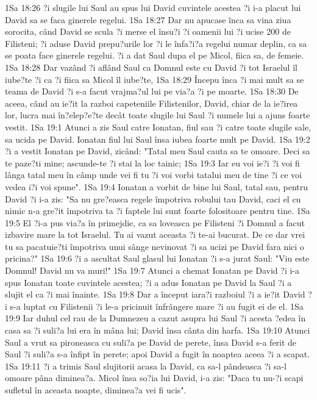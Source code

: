 1Sa 18:26  ?i slugile lui Saul au spus lui David cuvintele acestea ?i i-a placut lui David sa se faca ginerele regelui.
1Sa 18:27  Dar nu apucase înca sa vina ziua sorocita, când David se scula ?i merse el însu?i ?i oamenii lui ?i ucise 200 de Filisteni; ?i aduse David prepu?urile lor ?i le înfa?i?a regelui numar deplin, ca sa se poata face ginerele regelui. ?i a dat Saul dupa el pe Micol, fiica sa, de femeie.
1Sa 18:28  Dar vazând ?i aflând Saul ca Domnul este cu David ?i tot Israelul îl iube?te ?i ca ?i fiica sa Micol îl iube?te,
1Sa 18:29  Începu înca ?i mai mult sa se teama de David ?i s-a facut vrajma?ul lui pe via?a ?i pe moarte.
1Sa 18:30  De aceea, când au ie?it la razboi capeteniile Filistenilor, David, chiar de la ie?irea lor, lucra mai în?elep?e?te decât toate slugile lui Saul ?i numele lui a ajuns foarte vestit.
1Sa 19:1  Atunci a zis Saul catre Ionatan, fiul sau ?i catre toate slugile sale, sa ucida pe David. Ionatan fiul lui Saul însa iubea foarte mult pe David.
1Sa 19:2  ?i a vestit Ionatan pe David, zicând: "Tatal meu Saul cauta sa te omoare. Deci sa te paze?ti mine; ascunde-te ?i stai la loc tainic;
1Sa 19:3  Iar eu voi ie?i ?i voi fi lânga tatal meu în câmp unde vei fi tu ?i voi vorbi tatalui meu de tine ?i ce voi vedea i?i voi spune".
1Sa 19:4  Ionatan a vorbit de bine lui Saul, tatal sau, pentru David ?i i-a zis: "Sa nu gre?easca regele împotriva robului tau David, caci el cu nimic n-a gre?it împotriva ta ?i faptele lui sunt foarte folositoare pentru tine.
1Sa 19:5  El ?i-a pus via?a în primejdie, ca sa loveasca pe Filisteni ?i Domnul a facut izbavire mare la tot Israelul. Tu ai vazut aceasta ?i te-ai bucurat. De ce dar vrei tu sa pacatuie?ti împotriva unui sânge nevinovat ?i sa ucizi pe David fara nici o pricina?"
1Sa 19:6  ?i a ascultat Saul glasul lui Ionatan ?i s-a jurat Saul: "Viu este Domnul! David nu va muri!"
1Sa 19:7  Atunci a chemat Ionatan pe David ?i i-a spus Ionatan toate cuvintele acestea; ?i a adus Ionatan pe David la Saul ?i a slujit el ca ?i mai înainte.
1Sa 19:8  Dar a început iara?i razboiul ?i a ie?it David ?i s-a luptat cu Filistenii ?i le-a pricinuit înfrângere mare ?i au fugit ei de el.
1Sa 19:9  Iar duhul cel rau de la Dumnezeu a cazut asupra lui Saul ?i acesta ?edea în casa sa ?i suli?a lui era în mâna lui; David însa cânta din harfa.
1Sa 19:10  Atunci Saul a vrut sa pironeasca cu suli?a pe David de perete, însa David s-a ferit de Saul ?i suli?a s-a înfipt în perete; apoi David a fugit în noaptea aceea ?i a scapat.
1Sa 19:11  ?i a trimis Saul slujitorii acasa la David, ca sa-l pândeasca ?i sa-l omoare pâna diminea?a. Micol însa so?ia lui David, i-a zis: "Daca tu nu-?i scapi sufletul în aceasta noapte, diminea?a vei fi ucis".
